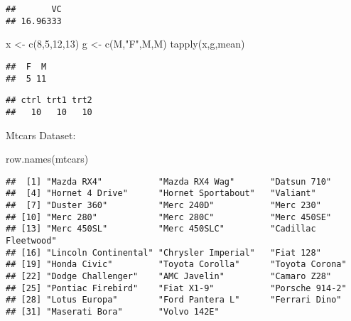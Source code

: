 \documentclass[
]{article}
\newenvironment{Shaded}{\begin{snugshade}}{\end{snugshade}}
\newcommand{\DecValTok}[1]{\textcolor[rgb]{0.00,0.00,0.81}{#1}}
\newcommand{\FunctionTok}[1]{\textcolor[rgb]{0.00,0.00,0.00}{#1}}
\newcommand{\NormalTok}[1]{#1}
\newcommand{\OtherTok}[1]{\textcolor[rgb]{0.56,0.35,0.01}{#1}}
\newcommand{\SpecialCharTok}[1]{\textcolor[rgb]{0.00,0.00,0.00}{#1}}
\newcommand{\StringTok}[1]{\textcolor[rgb]{0.31,0.60,0.02}{#1}}
\begin{document}
\begin{verbatim}
##       VC 
## 16.96333
\end{verbatim}

\begin{Shaded}
\begin{Highlighting}[]
\NormalTok{x }\OtherTok{\textless{}{-}} \FunctionTok{c}\NormalTok{(}\DecValTok{8}\NormalTok{,}\DecValTok{5}\NormalTok{,}\DecValTok{12}\NormalTok{,}\DecValTok{13}\NormalTok{)}
\NormalTok{g }\OtherTok{\textless{}{-}} \FunctionTok{c}\NormalTok{(}\StringTok{\textquotesingle{}M\textquotesingle{}}\NormalTok{,}\StringTok{"F"}\NormalTok{,}\StringTok{\textquotesingle{}M\textquotesingle{}}\NormalTok{,}\StringTok{\textquotesingle{}M\textquotesingle{}}\NormalTok{)}
\FunctionTok{tapply}\NormalTok{(x,g,mean)}
\end{Highlighting}
\end{Shaded}

\begin{verbatim}
##  F  M 
##  5 11
\end{verbatim}

\begin{Shaded}
\end{Shaded}

\begin{verbatim}
## ctrl trt1 trt2 
##   10   10   10
\end{verbatim}

Mtcars Dataset:

\begin{Shaded}
\begin{Highlighting}[]
\FunctionTok{row.names}\NormalTok{(mtcars)}
\end{Highlighting}
\end{Shaded}

\begin{verbatim}
##  [1] "Mazda RX4"           "Mazda RX4 Wag"       "Datsun 710"         
##  [4] "Hornet 4 Drive"      "Hornet Sportabout"   "Valiant"            
##  [7] "Duster 360"          "Merc 240D"           "Merc 230"           
## [10] "Merc 280"            "Merc 280C"           "Merc 450SE"         
## [13] "Merc 450SL"          "Merc 450SLC"         "Cadillac Fleetwood" 
## [16] "Lincoln Continental" "Chrysler Imperial"   "Fiat 128"           
## [19] "Honda Civic"         "Toyota Corolla"      "Toyota Corona"      
## [22] "Dodge Challenger"    "AMC Javelin"         "Camaro Z28"         
## [25] "Pontiac Firebird"    "Fiat X1-9"           "Porsche 914-2"      
## [28] "Lotus Europa"        "Ford Pantera L"      "Ferrari Dino"       
## [31] "Maserati Bora"       "Volvo 142E"
\end{verbatim}
\end{document}
